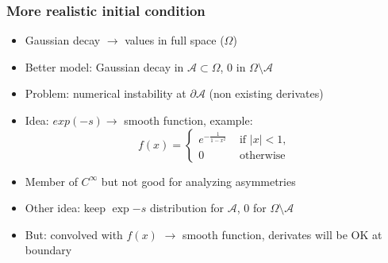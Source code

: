 \documentclass{beamer}
\begin{document}
\begin{frame}
\frametitle{More realistic initial condition}
\begin{itemize}
  \setlength{\itemsep}{12pt}
\item<1-> Gaussian decay $\rightarrow$ values in full space ($\Omega$)
\item<1-> Better model: Gaussian decay in $\mathcal{A}\subset \Omega$, $0$ in $\Omega \setminus \mathcal{A}$
\item<1-> Problem: numerical instability at $\partial \mathcal{A}$ (non existing derivates)
\item<1-> Idea: $exp(-s)\rightarrow$ smooth function, example:
\begin{equation*}
{\displaystyle f(x)={\begin{cases}e^{-{\frac {1}{1-x^{2}}}}&{\text{ if }}|x|<1,\\0&{\text{ otherwise }}\end{cases}}}
\end{equation*}
\item<1-> Member of $C^{\infty}$ but not good for analyzing asymmetries
\item<1-> Other idea: keep $\exp{-s}$ distribution for $\mathcal{A}$, $0$ for $\Omega\setminus\mathcal{A}$

\item<1-> But: convolved with $f(x)$ $\rightarrow$ smooth function, derivates will be OK at boundary

\end{itemize}
\end{frame}
\end{document}
